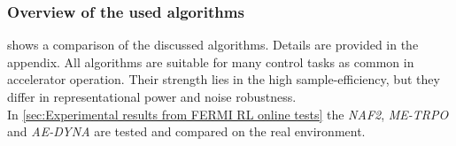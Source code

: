 \documentclass[
reprint,
amsmath,amssymb,amsfonts,clevref,
aps,
prstab,
]{revtex4-2}
\begin{document}
	\subsubsection{Overview of the used algorithms}
	 shows a comparison of the discussed algorithms. Details are provided in the appendix. All algorithms are suitable for many control tasks as common in accelerator operation. Their strength lies in the high sample-efficiency, but they differ in representational power and noise robustness. \\
	In \cref{sec:Experimental results from FERMI RL online tests} the \emph{NAF2},
	\emph{ME-TRPO} and \emph{AE-DYNA} are tested and compared on the real environment.
\begin{table}[b]%
	\caption{\label{tab:overview_algorithms}%
		An overview of the algorithms discussed in this paper.
	}
\end{table}
\end{document}
